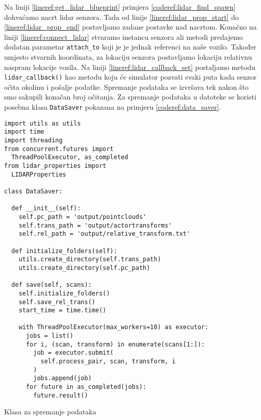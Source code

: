 Na liniji \ref{lineref:get_lidar_blueprint} primjera \ref{coderef:lidar_find_spawn} dohvaćamo nacrt lidar senzora. Tada od linije \ref{lineref:lidar_prop_start} do \ref{lineref:lidar_prop_end} postavljamo zadane postavke nad nacrtom. Konačno na liniji \ref{lineref:connect_lidar} stvaramo instancu senzora ali metodi predajemo dodatan parametar \texttt{attach_to} koji je je jednak referenci na naše vozilo. Također umjesto stvarnih koordinata, za lokaciju senzora postavljamo lokaciju relativnu naspram lokacije vozila. Na liniji \ref{lineref:lidar_callback_set} postaljamo metodu \texttt{lidar_callback()} kao metodu koju će simulator pozvati svaki puta kada senzor očita okolinu i pošalje podatke.
Spremanje podataka se izvršava tek nakon što smo sakupili konačan broj očitanja. Za spremanje podataka u datoteke se koristi posebna klasa \texttt{DataSaver} pokazana na primjeru \ref{coderef:data_saver}.

\begin{listing}[h!]
  \begin{verbatim}
import utils as utils
import time
import threading
from concurrent.futures import
  ThreadPoolExecutor, as_completed
from lidar_properties import
  LIDARProperties

class DataSaver:

  def __init__(self):
    self.pc_path = 'output/pointclouds'
    self.trans_path = 'output/actortransforms'
    self.rel_path = 'output/relative_transform.txt'

  def initialize_folders(self):
    utils.create_directory(self.trans_path)
    utils.create_directory(self.pc_path)

  def save(self, scans):
    self.initialize_folders()
    self.save_rel_trans()
    start_time = time.time()

    with ThreadPoolExecutor(max_workers=10) as executor:
      jobs = list()
      for i, (scan, transform) in enumerate(scans[1:]):
        job = executor.submit(
          self.process_pair, scan, transform, i
        )
        jobs.append(job)
      for future in as_completed(jobs):
        future.result()

  \end{verbatim}
  \caption{Klasa za spremanje podataka}
  \label{coderef:data_saver}
\end{listing}

